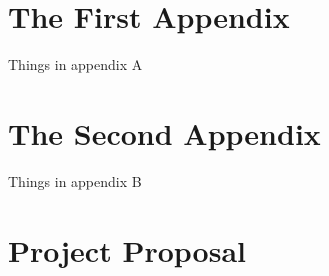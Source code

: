\documentclass[12pt,twoside,notitlepage]{report}
\begin{document}
\appendix

\chapter{The First Appendix}

Things in appendix A


\clearpage

\chapter{The Second Appendix}

Things in appendix B


\clearpage

\chapter{Project Proposal}
\clearpage


\end{document}
